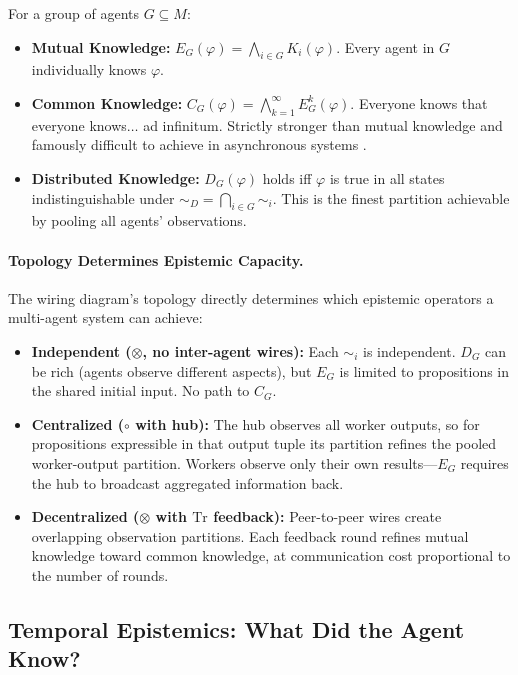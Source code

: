 \begin{definition}
\label{def:group-epistemic-operators}
For a group of agents $G \subseteq M$:
\begin{itemize}[leftmargin=*]
\item \textbf{Mutual Knowledge:} $E_G(\varphi) = \bigwedge_{i \in G} K_i(\varphi)$. Every agent in $G$ individually knows $\varphi$.
\item \textbf{Common Knowledge:} $C_G(\varphi) = \bigwedge_{k=1}^{\infty} E_G^k(\varphi)$. Everyone knows that everyone knows$\ldots$ ad infinitum. Strictly stronger than mutual knowledge and famously difficult to achieve in asynchronous systems \cite{halpern1990knowledge}.
\item \textbf{Distributed Knowledge:} $D_G(\varphi)$ holds iff $\varphi$ is true in all states indistinguishable under $\sim_D = \bigcap_{i \in G} \sim_i$. This is the finest partition achievable by pooling all agents' observations.
\end{itemize}
\end{definition}

\paragraph{Topology Determines Epistemic Capacity.}
The wiring diagram's topology directly determines which epistemic operators a multi-agent system can achieve:
\begin{itemize}[leftmargin=*]
\item \textbf{Independent ($\otimes$, no inter-agent wires):} Each $\sim_i$ is independent. $D_G$ can be rich (agents observe different aspects), but $E_G$ is limited to propositions in the shared initial input. No path to $C_G$.
\item \textbf{Centralized ($\circ$ with hub):} The hub observes all worker outputs, so for propositions expressible in that output tuple its partition refines the pooled worker-output partition. Workers observe only their own results---$E_G$ requires the hub to broadcast aggregated information back.
\item \textbf{Decentralized ($\otimes$ with $\mathrm{Tr}$ feedback):} Peer-to-peer wires create overlapping observation partitions. Each feedback round refines mutual knowledge toward common knowledge, at communication cost proportional to the number of rounds.
\end{itemize}

\subsection{Temporal Epistemics: What Did the Agent Know?}
\label{sec:temporal-epistemics}

